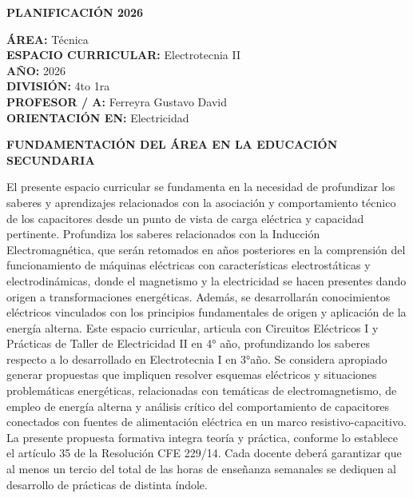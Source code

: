 \documentclass[a4paper,12pt]{article}
\begin{document}
\begin{center}
  \fontsize{14pt}{16pt}\selectfont \textbf{PLANIFICACIÓN 2026}
\end{center}

\vspace{0.3cm}

\raggedright
\textbf{ÁREA:} Técnica \\
\textbf{ESPACIO CURRICULAR:} Electrotecnia II \\
\textbf{AÑO:} 2026 \\
\textbf{DIVISIÓN:} 4to 1ra \\
\textbf{PROFESOR / A:} Ferreyra Gustavo David \\
\textbf{ORIENTACIÓN EN:} Electricidad

\vspace{0.5cm}

\begin{center}\fontsize{12pt}{14pt}\selectfont
  \textbf{\uppercase{FUNDAMENTACIÓN DEL ÁREA EN LA EDUCACIÓN SECUNDARIA}}
\end{center}
El presente espacio curricular se fundamenta en la necesidad de
profundizar los saberes y aprendizajes relacionados con la asociación
y comportamiento técnico de los capacitores desde un punto de vista
de carga eléctrica y capacidad pertinente. Profundiza los saberes
relacionados con la Inducción Electromagnética, que serán retomados
en años posteriores en la comprensión del funcionamiento de máquinas
eléctricas con características electrostáticas y electrodinámicas,
donde el magnetismo y la electricidad se hacen presentes dando origen
a transformaciones energéticas. Además, se desarrollarán
conocimientos eléctricos vinculados con los principios fundamentales
de origen y aplicación de la energía alterna. Este espacio
curricular, articula con Circuitos Eléctricos I y Prácticas de Taller
de Electricidad II en 4° año, profundizando los saberes respecto a lo
desarrollado en Electrotecnia I en 3°año. Se considera apropiado
generar propuestas que impliquen resolver esquemas eléctricos y
situaciones problemáticas energéticas, relacionadas con temáticas de
electromagnetismo, de empleo de energía alterna y análisis crítico
del comportamiento de capacitores conectados con fuentes de
alimentación eléctrica en un marco resistivo-capacitivo. La presente
propuesta formativa integra teoría y práctica, conforme lo establece
el artículo 35 de la Resolución CFE 229/14. Cada docente deberá
garantizar que al menos un tercio del total de las horas de enseñanza
semanales se dediquen al desarrollo de prácticas de distinta índole.
\end{document}
